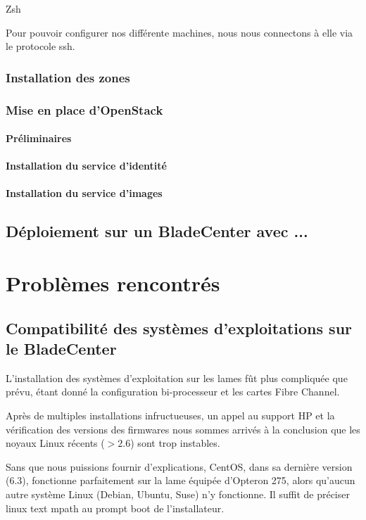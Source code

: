\documentclass[a4paper,oneside]{report}
\begin{document}
Zsh

Pour pouvoir configurer nos différente machines, nous nous connectons à elle via le protocole ssh.

\subsection{Installation des zones}

\subsection{Mise en place d'OpenStack}
\subsubsection{Préliminaires}

\subsubsection{Installation du service d'identité}

\subsubsection{Installation du service d'images}

\section{Déploiement sur un BladeCenter avec ...}


\chapter{Problèmes rencontrés}
\section{Compatibilité des systèmes d'exploitations sur le BladeCenter}
\label{sec:compatblade}
L'installation des systèmes d'exploitation sur les lames fût plus compliquée que prévu, étant donné la configuration bi-processeur et les cartes Fibre Channel.

Après de multiples installations infructueuses, un appel au support HP et la vérification des versions des firmwares nous sommes arrivés à la conclusion que les noyaux Linux récents ($ > 2.6 $) sont trop instables.

Sans que nous puissions fournir d'explications, CentOS, dans sa dernière version (6.3), fonctionne parfaitement sur la lame équipée d'Opteron 275, alors qu'aucun autre système Linux (Debian, Ubuntu, Suse) n'y fonctionne.
Il suffit de préciser linux text mpath au prompt boot de l'installateur.
\end{document}
